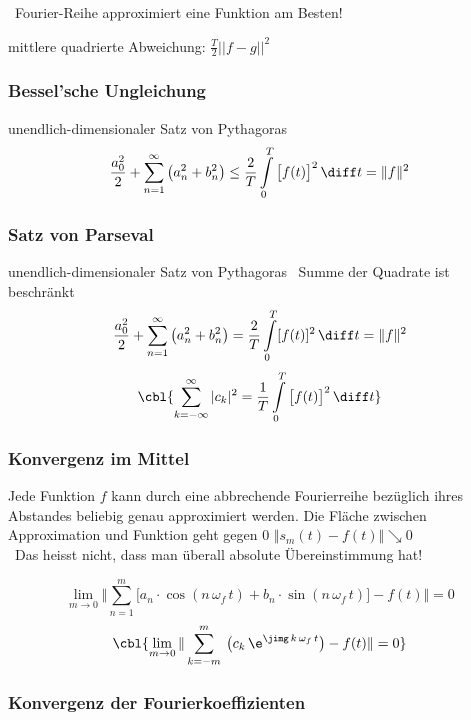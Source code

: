 \textrightarrow\ Fourier-Reihe approximiert eine Funktion am Besten!

\smallskip

mittlere quadrierte Abweichung: $\frac{T}{2} \vert \vert f - g \vert \vert ^2$


\subsubsection{Bessel'sche Ungleichung}

unendlich-dimensionaler Satz von Pythagoras
$$ \frac{a_0^2}{2} + \sum \limits_{n=1}^\infty \big( a_n^2 + b_n^2 \big) \leq  \frac{2}{T} \int \limits_0^T \big[f(t) \big]^2 \, \diff t = \Vert f \Vert ^2 $$


\subsubsection{Satz von Parseval}

unendlich-dimensionaler Satz von Pythagoras \textrightarrow\ Summe der Quadrate ist beschränkt
$$ \frac{a_0^2}{2} + \sum \limits_{n=1}^\infty \big( a_n^2 + b_n^2 \big) = \frac{2}{T} \int \limits_0^T [f(t)]^2 \, \diff t = \Vert f \Vert ^2 $$
$$ \cbl{ \sum \limits_{k= -\infty}^\infty \vert c_k \vert ^2 = \frac{1}{T} \int \limits_0^T \big[ f(t) \big]^2 \, \diff t } $$


\subsubsection{Konvergenz im Mittel}

Jede Funktion $f$ kann durch eine abbrechende Fourierreihe bezüglich ihres Abstandes beliebig genau approximiert werden.
Die Fläche zwischen Approximation und Funktion geht gegen 0 \quad $\Vert s_m(t) - f(t) \Vert \searrow 0$ \\
\textrightarrow\ Das heisst nicht, dass man überall absolute Übereinstimmung hat!

$$ \lim \limits_{m \to 0} \Vert \sum\limits _{n=1}^m \big[ a_n \cdot \cos(n \, \omega_f \, t) + b_n \cdot \sin(n \, \omega_f \, t) \big] - f(t) \Vert = 0 $$
$$ \cbl{\lim \limits_{m \to 0} \Vert \sum\limits _{k= -m}^m \: \big( c_k \, \e^{ \jimg \, k \, \omega_f \, t} \big) - f(t) \Vert = 0} $$


\subsubsection{Konvergenz der Fourierkoeffizienten}

